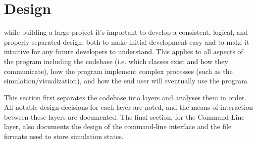 
\chapter{Design}
\label{sec:Design} 

while building a large project it's important to develop a consistent, logical, and properly separated design; both to make initial development easy and to make it intuitive for any future developers to understand.
This applies to all aspects of the program including the codebase (i.e. which classes exist and how they communicate), how the program implement complex processes (such as the simulation/visualization), and how the end user will eventually use the program.

This section first separates the codebase into layers and analyses them in order.%
All notable design decisions for each layer are noted, and the means of interaction between these layers are documented.
The final section, for the Command-Line layer, also documents the design of the command-line interface and the file formats used to store simulation states.


